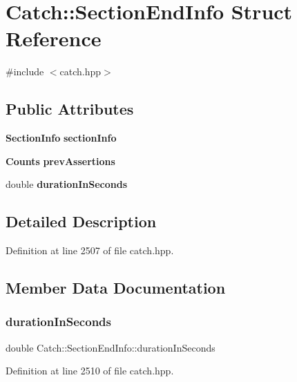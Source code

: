 \section{Catch\+::Section\+End\+Info Struct Reference}
\label{struct_catch_1_1_section_end_info}


{\ttfamily \#include $<$catch.\+hpp$>$}

\subsection*{Public Attributes}
\begin{DoxyCompactItemize}
\item 
\textbf{ Section\+Info} \textbf{ section\+Info}
\item 
\textbf{ Counts} \textbf{ prev\+Assertions}
\item 
double \textbf{ duration\+In\+Seconds}
\end{DoxyCompactItemize}


\subsection{Detailed Description}


Definition at line 2507 of file catch.\+hpp.



\subsection{Member Data Documentation}
\mbox{\label{struct_catch_1_1_section_end_info_a7c262f2dab9cff166b8eca620c47eea5}} 
\subsubsection{durationInSeconds}
{\footnotesize\ttfamily double Catch\+::\+Section\+End\+Info\+::duration\+In\+Seconds}



Definition at line 2510 of file catch.\+hpp.

\mbox{\label{struct_catch_1_1_section_end_info_ae70b154cbc05b5dd2901d97f89303d8c}} 
